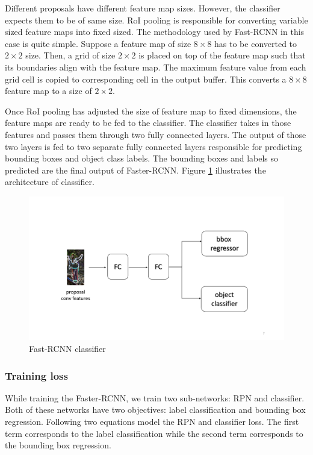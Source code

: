 Different proposals have different feature map sizes. However, the classifier expects them to be of same size. RoI pooling is responsible for converting variable sized feature maps into fixed sized. The methodology used by Fast-RCNN in this case is quite simple. Suppose a feature map of size $8\times 8$ has to be converted to $2 \times 2$ size. Then, a grid of size $2 \times 2$ is placed on top of the feature map such that its boundaries align with the feature map. The maximum feature value from each grid cell is copied to corresponding cell in the output buffer. This converts a $8\times 8$ feature map to a size of $2 \times 2$.

Once RoI pooling has adjusted the size of feature map to fixed dimensions, the feature maps are ready to be fed to the classifier. The classifier takes in those features and passes them through two fully connected layers. The output of those two layers is fed to two separate fully connected layers responsible for predicting bounding boxes and object class labels. The bounding boxes and labels so predicted are the final output of Faster-RCNN. Figure \ref{fig:classifier} illustrates the architecture of classifier.

\begin{figure}
    \centering
    \includegraphics[width=\linewidth,trim={0 90 0 120},clip]{images/classifier}
    \caption{Fast-RCNN classifier}
    \label{fig:classifier}
\end{figure}

\subsubsection{Training loss}
While training the Faster-RCNN, we train two sub-networks: RPN and classifier. Both of these networks have two objectives: label classification and bounding box regression. Following two equations model the RPN and classifier loss. The first term corresponds to the label classification while the second term corresponds to the bounding box regression. 

